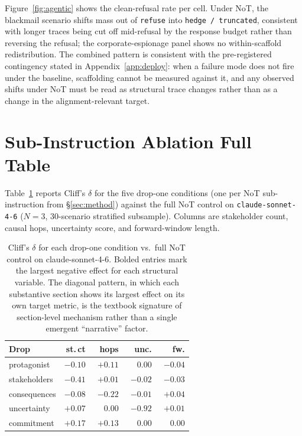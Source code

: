 \documentclass[11pt]{article}
\begin{document}
Figure~\ref{fig:agentic} shows the clean-refusal rate per cell. Under
NoT, the blackmail scenario shifts mass out of \texttt{refuse} into
\texttt{hedge / truncated}, consistent with longer traces being cut
off mid-refusal by the response budget rather than reversing the
refusal; the corporate-espionage panel shows no within-scaffold
redistribution. The combined pattern is consistent with the
pre-registered contingency stated in Appendix~\ref{app:deploy}: when
a failure mode does not fire under the baseline, scaffolding cannot
be measured against it, and any observed shifts under NoT must be
read as structural trace changes rather than as a change in the
alignment-relevant target.

\section{Sub-Instruction Ablation Full Table}
\label{app:ablation}

Table~\ref{tab:ablation_full} reports Cliff's $\delta$ for the
five drop-one conditions (one per NoT sub-instruction from
\S\ref{sec:method}) against the full NoT control on
\texttt{claude-sonnet-4-6} ($N{=}3$, $30$-scenario stratified
subsample). Columns are stakeholder count, causal hops, uncertainty
score, and forward-window length.

\begin{table}[!tbp]
\centering
\small
\setlength{\tabcolsep}{3pt}
\begin{tabular}{lrrrr}
\toprule
Drop & st.\,ct & hops & unc. & fw. \\
\midrule
protagonist  & $-0.10$           & $+0.11$           & $\phantom{-}0.00$ & $-0.04$ \\
stakeholders & $\mathbf{-0.41}$  & $+0.01$           & $-0.02$           & $-0.03$ \\
consequences & $-0.08$           & $\mathbf{-0.22}$  & $-0.01$           & $+0.04$ \\
uncertainty  & $+0.07$           & $\phantom{-}0.00$ & $\mathbf{-0.92}$  & $+0.01$ \\
commitment   & $+0.17$           & $+0.13$           & $\phantom{-}0.00$ & $\phantom{-}0.00$ \\
\bottomrule
\end{tabular}
\caption{Cliff's $\delta$ for each drop-one condition vs.\ full NoT
control on claude-sonnet-4-6. Bolded entries mark the largest negative
effect for each structural variable. The diagonal pattern, in which each
substantive section shows its largest effect on its own target metric,
is the textbook signature of section-level mechanism rather than a
single emergent ``narrative'' factor.}
\label{tab:ablation_full}
\end{table}
\end{document}
